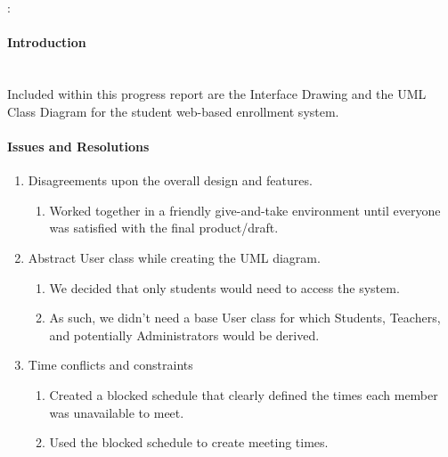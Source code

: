 \documentclass[12pt,oneside]{article}
\begin{document}


\begin{center}
{\large\bf \projectTitle \\ ~\\}
{\teamName: \\\teamMembers}
\end{center}



\doublespace
\paragraph{Introduction}
\hfill \\
Included within this progress report are the Interface Drawing and the UML
Class Diagram for the student web-based enrollment system.
\singlespace

\paragraph{Issues and Resolutions}
\begin{enumerate}
    \item Disagreements upon the overall design and features.
        \begin{enumerate}
            \item Worked together in a friendly give-and-take environment until everyone was
                  satisfied with the final product/draft.
        \end{enumerate}
    \item Abstract User class while creating the UML diagram.
        \begin{enumerate}
            \item We decided that only students would need to access the system.
            \item As such, we didn't need a base User class for which Students,
                  Teachers, and potentially Administrators would be derived.
        \end{enumerate}
    \item Time conflicts and constraints
        \begin{enumerate}
            \item Created a blocked schedule that clearly defined the times each member was
                  unavailable to meet.
            \item Used the blocked schedule to create meeting times.
        \end{enumerate}
\end{enumerate}
\end{document}
